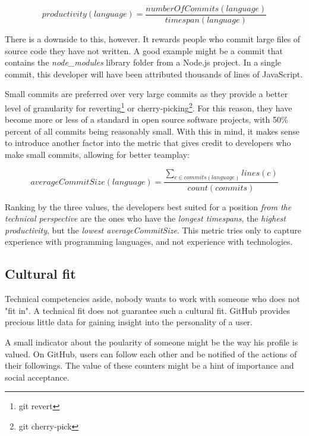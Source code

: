\begin{equation}
productivity(language) = \frac{numberOfCommits(language)}{timespan(language)}
\label{eq:productivity}
\end{equation}

There is a downside to this, however. It rewards people who commit large files of source code they have not written. A good example might be a commit that contains the \textit{node\_modules} library folder from a Node.js project. In a single commit, this developer will have been attributed thousands of lines of JavaScript.

Small commits are preferred \cite{so:commitsize} over very large commits as they provide a better level of granularity for reverting\footnote{git revert} or cherry-picking\footnote{git cherry-pick}. For this reason, they have become more or less of a standard in open source software projects, with 50\% percent of all commits being reasonably small\cite{rsk:2014}. With this in mind, it makes sense to introduce another factor into the metric that gives credit to developers who make small commits, allowing for better teamplay:

\begin{equation}
averageCommitSize(language) = \frac{\sum_{c \in commits(language)} lines(c)}{count(commits)}
\label {eq:avgcommitsize}
\end{equation}

Ranking by the three values, the developers best suited for a position \textit{from the technical perspective} are the ones who have the \textit{longest timespans}, the \textit{highest productivity}, but the \textit{lowest averageCommitSize}. This metric tries only to capture experience with programming languages, and not experience with technologies.

\subsection{Cultural fit}
Technical competencies aside, nobody wants to work with someone who does not "fit in".
A technical fit does not guarantee such a cultural fit. GitHub provides precious little data for gaining insight into the personality of a user.

A small indicator about the poularity of someone might be the way his profile is valued. On GitHub, users can follow each other and be notified of the actions of their followings. The value of these counters might be a hint of importance and social acceptance.

